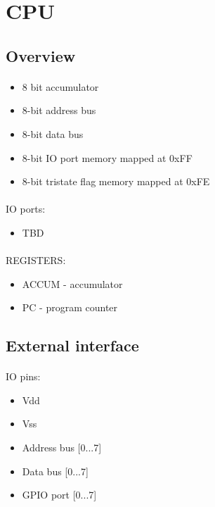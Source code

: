 \section{CPU}

\subsection{Overview}
\paragraph*{}
\begin{itemize}
\item 8 bit accumulator
\item 8-bit address bus
\item 8-bit data bus
\item 8-bit IO port memory mapped at 0xFF
\item 8-bit tristate flag memory mapped at 0xFE
\end{itemize}

\paragraph*{}
IO ports:
\begin{itemize}
\item TBD
\end{itemize}

\paragraph*{}
REGISTERS:
\begin{itemize}
\item ACCUM - accumulator
\item PC - program counter
\end{itemize}

\subsection{External interface}
\paragraph*{}
IO pins:
\begin{itemize}
\item Vdd
\item Vss
\item Address bus [0...7]
\item Data bus [0...7]
\item GPIO port [0...7]
\end{itemize}

